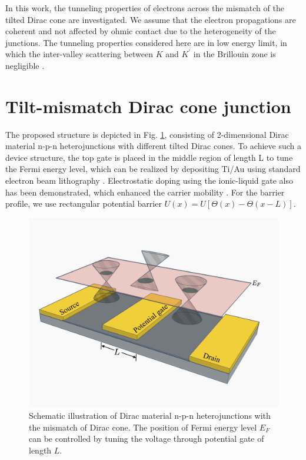 In this work, the tunneling properties of electrons across the mismatch of the tilted Dirac cone are investigated.
We assume that the electron propagations are coherent and not affected by ohmic contact due to the heterogeneity of the junctions. 
The tunneling properties considered here are in low energy limit, in which the inter-valley scattering between $K$ and $K^\prime$ in the Brillouin zone is negligible \cite{Abergel2009}.
\section{Tilt-mismatch Dirac cone junction}
    The proposed structure is depicted in Fig. \ref{fig:transistor}, consisting of 2-dimensional Dirac material n-p-n heterojunctions with different tilted Dirac cones. 
    To achieve such a device structure, the top gate is placed in the middle region of length L to tune the Fermi energy level, which can be realized by depositing Ti/Au using standard electron beam lithography \cite{Huard2007}.
    Electrostatic doping using the ionic-liquid gate also has been demonstrated, which enhanced the carrier mobility \cite{Perera2013}. 
    For the barrier profile, we use rectangular potential barrier $U(x) = U[\Theta(x)-\Theta(x-L)]$.
    \begin{figure}[H]
        \centering
        \includegraphics[width=0.8\linewidth]{fig/Transistor.png}
        \caption{Schematic illustration of Dirac material n-p-n heterojunctions with the mismatch of Dirac cone. 
                    The position of Fermi energy level $E_F$ can be controlled by tuning the voltage through potential gate of length $L$.}
        \label{fig:transistor}
    \end{figure}

